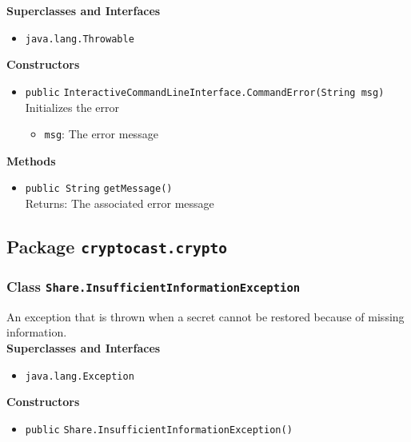 \textbf{Superclasses and Interfaces}
\begin{itemize}
\item \lstinline|java.lang.Throwable|
\end{itemize}



\textbf{Constructors}
\begin{itemize}
\item \lstinline|public| \lstinline|InteractiveCommandLineInterface.CommandError|\lstinline|(String msg)|\\
Initializes the error
\begin{itemize}
\item \lstinline|msg|: The error message
\end{itemize}



\end{itemize}


\textbf{Methods}
\begin{itemize}
\item \lstinline|public String| \lstinline|getMessage|\lstinline|()|\\
Returns: The associated error message



\end{itemize}


\subsection{Package \lstinline!cryptocast.crypto!}
\subsubsection{Class \lstinline|Share.InsufficientInformationException|}
An exception that is thrown when a secret cannot be restored because
 of missing information. \\


\textbf{Superclasses and Interfaces}
\begin{itemize}
\item \lstinline|java.lang.Exception|
\end{itemize}



\textbf{Constructors}
\begin{itemize}
\item \lstinline|public| \lstinline|Share.InsufficientInformationException|\lstinline|()|




\end{itemize}


